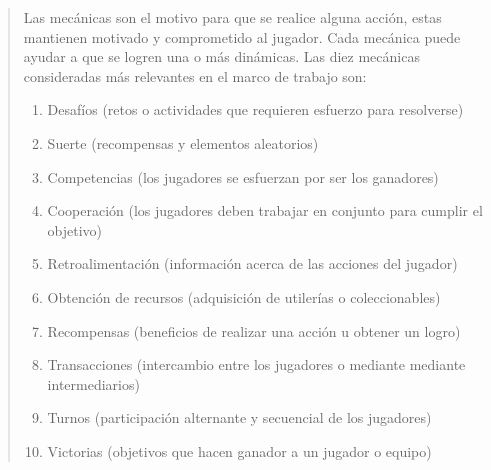  \begin{quote}
    Las mecánicas son el motivo para que se realice alguna acción, estas mantienen
    motivado y comprometido al jugador. Cada mecánica puede ayudar a que se logren una o
    más dinámicas. Las diez mecánicas consideradas más relevantes en el marco de trabajo
    son:

    \begin{enumerate}
        \item Desafíos (retos o actividades que requieren esfuerzo para resolverse)
        \item Suerte (recompensas y elementos aleatorios)
        \item Competencias (los jugadores se esfuerzan por ser los ganadores)
        \item Cooperación (los jugadores deben trabajar en conjunto para cumplir el objetivo)
        \item Retroalimentación (información acerca de las acciones del jugador)
        \item Obtención de recursos (adquisición de utilerías o coleccionables)
        \item Recompensas (beneficios de realizar una acción u obtener un logro)
        \item Transacciones (intercambio entre los jugadores o mediante mediante intermediarios)
        \item Turnos (participación alternante y secuencial de los jugadores)
        \item Victorias (objetivos que hacen ganador a un jugador o equipo)\\
    \end{enumerate}
 \end{quote}


